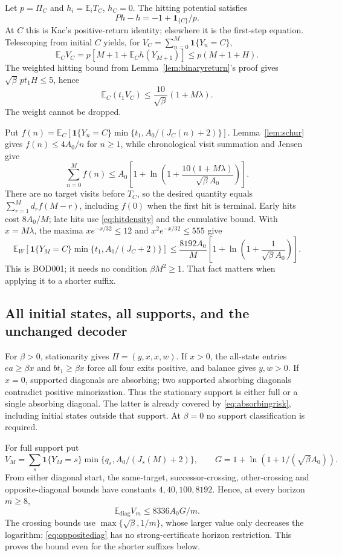 \documentclass[11pt,letterpaper]{article}
\theoremstyle{definition}\newtheorem{definition}[theorem]{Definition}
\theoremstyle{remark}\newtheorem{remark}[theorem]{Remark}
\newcommand{\E}{\mathbb{E}}
\newcommand{\ind}{\mathbf{1}}
\newcommand{\unit}[1]{\textsf{#1}}
\begin{document}
Let $p=\Pi_C$ and $h_i=\E_iT_C$, $h_C=0$. The hitting potential satisfies
\[
 Ph-h=-1+\ind_{\{C\}}/p.
\]
At $C$ this is Kac's positive-return identity; elsewhere it is the first-step equation. Telescoping from initial $C$ yields, for $V_C=\sum_{n=0}^M\ind\{Y_n=C\}$,
\[
 \E_CV_C=p[M+1+\E_Ch(Y_{M+1})]\le p(M+1+H).
\]
The weighted hitting bound from Lemma~\ref{lem:binaryreturn}'s proof gives
$\sqrt\beta\,pt_1H\le5$, hence
\[
 \E_C(t_1V_C)\le\frac{10}{\sqrt\beta}(1+M\lambda).
\]
The weight cannot be dropped.

Put $f(n)=\E_C[\ind\{Y_n=C\}\min\{t_1,A_0/(J_C(n)+2)\}]$.
Lemma~\ref{lem:schur} gives $f(n)\le4A_0/n$ for $n\ge1$, while chronological visit summation and Jensen give
\[
 \sum_{n=0}^Mf(n)
 \le A_0\left[1+\ln\left(1+
 \frac{10(1+M\lambda)}{\sqrt\beta A_0}\right)\right].
\]
There are no target visits before $T_C$, so the desired quantity equals
$\sum_{r=1}^Md_rf(M-r)$, including $f(0)$ when the first hit is terminal.
Early hits cost $8A_0/M$; late hits use \eqref{eq:hitdensity} and the cumulative bound. With $x=M\lambda$, the maxima
$x e^{-x/32}\le12$ and $x^2e^{-x/32}\le555$
give
\begin{equation}\label{eq:oppositediag}
 \E_W[\ind\{Y_M=C\}\min\{t_1,A_0/(J_C+2)\}]
 \le\frac{8192A_0}{M}
 \left[1+\ln\left(1+\frac1{\sqrt\beta A_0}\right)\right].
\end{equation}
This is \unit{BOD001}; it needs no condition $\beta M^2\ge1$. That fact matters when applying it to a shorter suffix.


\subsection{All initial states, all supports, and the unchanged decoder}
For $\beta>0$, stationarity gives $\Pi=(y,x,x,w)$.
If $x>0$, the all-state entries $ea\ge\beta x$ and $bt_1\ge\beta x$ force all four exits positive, and balance gives $y,w>0$. If $x=0$, supported diagonals are absorbing; two supported absorbing diagonals contradict positive minorization. Thus the stationary support is either full or a single absorbing diagonal. The latter is already covered by \eqref{eq:absorbingrisk}, including initial states outside that support. At $\beta=0$ no support classification is required.

For full support put
\[
 V_M=\sum_s\ind\{Y_M=s\}\min\{q_s,A_0/(J_s(M)+2)\},
 \qquad G=1+\ln(1+1/(\sqrt\beta A_0)).
\]
From either diagonal start, the same-target, successor-crossing, other-crossing and opposite-diagonal bounds have constants $4,40,100,8192$. Hence, at every horizon $m\ge8$,
\[
 \E_{\mathrm{diag}}V_m\le8336 A_0G/m.
\]
The crossing bounds use $\max\{\sqrt\beta,1/m\}$, whose larger value only decreases the logarithm; \eqref{eq:oppositediag} has no strong-certificate horizon restriction. This proves the bound even for the shorter suffixes below.
\end{document}
